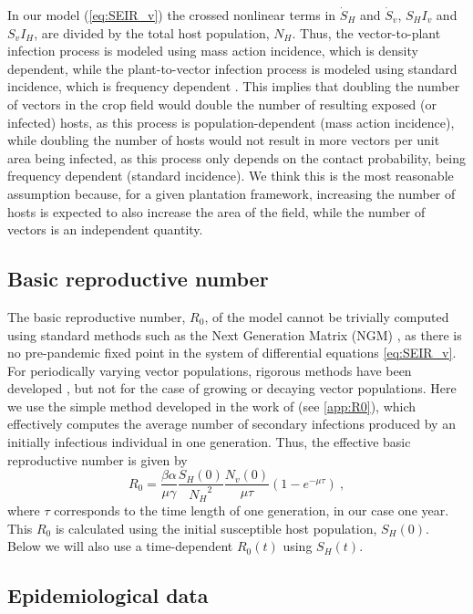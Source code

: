 In our model (\cref{eq:SEIR_v}) the crossed nonlinear terms in $\dot{S}_H$
and $\dot{S}_v$, $S_H I_v$ and $S_v I_H$, are divided by the total host
population, $N_H$. Thus, the vector-to-plant infection process is modeled using
mass action incidence, which is density dependent, while the plant-to-vector
infection process is modeled using standard incidence, which is frequency
dependent \cite{MartchevaBook}. This implies that doubling the number of
vectors in the crop field would double the number of resulting exposed (or
infected) hosts, as this process is population-dependent (mass action
incidence), while doubling the number of hosts would not result in more vectors
per unit area being infected, as this process only depends on the contact
probability, being frequency dependent (standard incidence). We think this is
the most reasonable assumption because, for a given plantation framework,
increasing the number of hosts is expected to also increase the area of the
field, while the number of vectors is an independent quantity.

\subsection{Basic reproductive number}

The basic reproductive number, $R_0$, of the model cannot be trivially
computed using standard methods such as the Next Generation Matrix (NGM)
\cite{Diekmann2010}, as there is no pre-pandemic fixed point in the system of
differential equations \cref{eq:SEIR_v}. For periodically varying vector
populations, rigorous methods have been developed \cite{Bacaer2007}, but not
for the case of growing or decaying vector populations. Here we use the simple
method developed in the work of \cite{GimenezRomero2022_PRE} (see
\cref{app:R0}), which
effectively computes the average number of secondary infections produced by an
initially infectious individual in one generation. Thus, the effective basic
reproductive number is given by
\begin{equation}\label{eq:R0}
    R_0=\frac{\beta\alpha}{\mu\gamma}\frac{S_H(0)}{{N_H}^2}
    \frac{N_v(0)}{\mu\tau}\left(1-e^{-\mu\tau}\right)
    \ ,
\end{equation}
where $\tau$ corresponds to the time length of one generation, in our case
one year. This $R_0$ is calculated using the initial susceptible host
population, $S_H(0)$. Below we will also use a time-dependent $R_0(t)$ using
$S_H(t)$.

\subsection{Epidemiological data}

